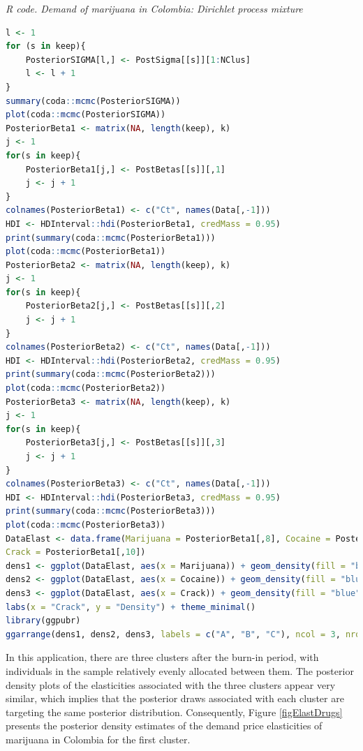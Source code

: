 \begin{tcolorbox}[enhanced,width=4.67in,center upper,
	fontupper=\large\bfseries,drop shadow southwest,sharp corners]
	\textit{R code. Demand of marijuana in Colombia: Dirichlet process mixture}
	\begin{VF}
		\begin{lstlisting}[language=R]
l <- 1
for (s in keep){
	PosteriorSIGMA[l,] <- PostSigma[[s]][1:NClus]
	l <- l + 1
}
summary(coda::mcmc(PosteriorSIGMA))
plot(coda::mcmc(PosteriorSIGMA))
PosteriorBeta1 <- matrix(NA, length(keep), k)
j <- 1
for(s in keep){
	PosteriorBeta1[j,] <- PostBetas[[s]][,1]
	j <- j + 1
}
colnames(PosteriorBeta1) <- c("Ct", names(Data[,-1]))
HDI <- HDInterval::hdi(PosteriorBeta1, credMass = 0.95)
print(summary(coda::mcmc(PosteriorBeta1)))
plot(coda::mcmc(PosteriorBeta1))
PosteriorBeta2 <- matrix(NA, length(keep), k)
j <- 1
for(s in keep){
	PosteriorBeta2[j,] <- PostBetas[[s]][,2]
	j <- j + 1
}
colnames(PosteriorBeta2) <- c("Ct", names(Data[,-1]))
HDI <- HDInterval::hdi(PosteriorBeta2, credMass = 0.95)
print(summary(coda::mcmc(PosteriorBeta2)))
plot(coda::mcmc(PosteriorBeta2))
PosteriorBeta3 <- matrix(NA, length(keep), k)
j <- 1
for(s in keep){
	PosteriorBeta3[j,] <- PostBetas[[s]][,3]
	j <- j + 1
}
colnames(PosteriorBeta3) <- c("Ct", names(Data[,-1]))
HDI <- HDInterval::hdi(PosteriorBeta3, credMass = 0.95)
print(summary(coda::mcmc(PosteriorBeta3)))
plot(coda::mcmc(PosteriorBeta3))
DataElast <- data.frame(Marijuana = PosteriorBeta1[,8], Cocaine = PosteriorBeta1[,9],
Crack = PosteriorBeta1[,10]) 
dens1 <- ggplot(DataElast, aes(x = Marijuana)) + geom_density(fill = "blue", alpha = 0.3) + labs(x = "Marijuana", y = "Density") + theme_minimal()
dens2 <- ggplot(DataElast, aes(x = Cocaine)) + geom_density(fill = "blue", alpha = 0.3) +  labs(x = "Cocaine", y = "Density") + theme_minimal()
dens3 <- ggplot(DataElast, aes(x = Crack)) + geom_density(fill = "blue", alpha = 0.3) + 
labs(x = "Crack", y = "Density") + theme_minimal()
library(ggpubr)
ggarrange(dens1, dens2, dens3, labels = c("A", "B", "C"), ncol = 3, nrow = 1, legend = "bottom", common.legend = TRUE)
\end{lstlisting}
	\end{VF}
\end{tcolorbox}


In this application, there are three clusters after the burn-in period, with individuals in the sample relatively evenly allocated between them. The posterior density plots of the elasticities associated with the three clusters appear very similar, which implies that the posterior draws associated with each cluster are targeting the same posterior distribution. Consequently, Figure \ref{figElastDrugs} presents the posterior density estimates of the demand price elasticities of marijuana in Colombia for the first cluster.

